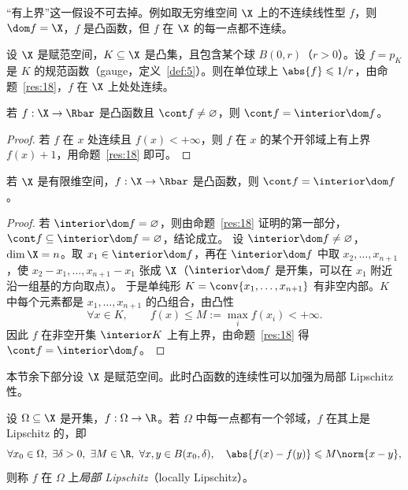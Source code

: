\begin{remark}
\label{rem:5}
“有上界”这一假设不可去掉。例如取无穷维空间 $\X$ 上的不连续线性型 $f$，则 $\dom f=\X$，$f$ 是凸函数，但 $f$ 在 $\X$ 的每一点都不连续。
\end{remark}

\begin{example}
\label{exa:6}
设 $\X$ 是赋范空间，$K\subseteq\X$ 是凸集，且包含某个球 $B(0,r)$（$r>0$）。设 $f=p_K$ 是 $K$ 的规范函数（gauge，定义~\ref{def:5}）。则在单位球上 $\abs{f}\leqslant1/r$，由命题~\ref{res:18}，$f$ 在 $\X$ 上处处连续。
\end{example}

\begin{corollary}
\label{res:19}
若 $f:\X\to\Rbar$ 是凸函数且 $\cont f\neq\varnothing$，则 $\cont f=\interior\dom f$。
\end{corollary}

\begin{proof}
若 $f$ 在 $x$ 处连续且 $f(x)<+\infty$，则 $f$ 在 $x$ 的某个开邻域上有上界 $f(x)+1$，用命题~\ref{res:18} 即可。
\end{proof}

\begin{corollary}
\label{res:20}
若 $\X$ 是有限维空间，$f:\X\to\Rbar$ 是凸函数，则 $\cont f=\interior\dom f$。
\end{corollary}

\begin{proof}
若 $\interior\dom f=\varnothing$，则由命题~\ref{res:18} 证明的第一部分，$\cont f\subseteq\interior\dom f=\varnothing$，结论成立。
设 $\interior\dom f\neq\varnothing$，$\dim\X=n$。取 $x_1\in\interior\dom f$，再在 $\interior\dom f$ 中取 $x_2,\dots,x_{n+1}$，使 $x_2-x_1,\dots,x_{n+1}-x_1$ 张成 $\X$（$\interior\dom f$ 是开集，可以在 $x_1$ 附近沿一组基的方向取点）。
于是单纯形 $K=\conv\{x_1,\dots,x_{n+1}\}$ 有非空内部。$K$ 中每个元素都是 $x_1,\dots,x_{n+1}$ 的凸组合，由凸性
\[
  \forall x\in K,\qquad f(x)\leqslant M:=\max_i f(x_i)<+\infty .
\]
因此 $f$ 在非空开集 $\interior K$ 上有上界，由命题~\ref{res:18} 得 $\cont f=\interior\dom f$。
\end{proof}

本节余下部分设 $\X$ 是赋范空间。此时凸函数的连续性可以加强为局部 Lipschitz 性。

\begin{definition}[局部 Lipschitz]
\label{def:14}
设 $\Omega\subseteq\X$ 是开集，$f:\Omega\to\R$。若 $\Omega$ 中每一点都有一个邻域，$f$ 在其上是 Lipschitz 的，即
\[
  \forall x_0\in\Omega,\ \exists\delta>0,\ \exists M\in\R,\ \forall x,y\in B(x_0,\delta),\quad \abs{f(x)-f(y)}\leqslant M\norm{x-y},
\]
则称 $f$ 在 $\Omega$ 上\emph{局部 Lipschitz}（locally Lipschitz）。
\end{definition}

